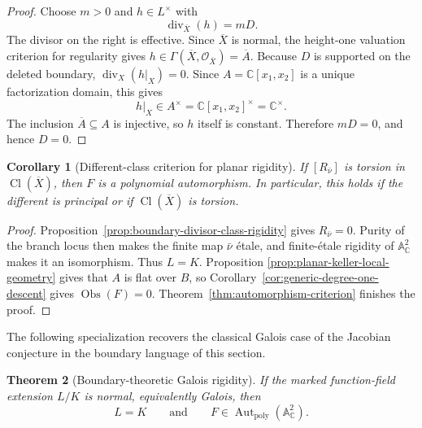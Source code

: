 \documentclass[11pt]{article}
\newtheorem{theorem}{Theorem}[section]
\newtheorem{corollary}[theorem]{Corollary}
\theoremstyle{remark}
\theoremstyle{definition}
\DeclareMathOperator{\Aut}{Aut}
\newcommand{\A}{\mathbb A}
\newcommand{\C}{\mathbb C}
\newcommand{\Obs}{\operatorname{Obs}}
\begin{document}
\begin{proof}
Choose \(m>0\) and \(h\in L^\times\) with
\[
  \operatorname{div}_{\overline X}(h)=mD.
\]
The divisor on the right is effective.  Since \(\overline X\) is normal,
the height-one valuation criterion for regularity gives
\(h\in\Gamma(\overline X,\mathcal O_{\overline X})=\overline A\).
Because \(D\) is supported on the deleted boundary,
\(\operatorname{div}_{X}(h|_X)=0\).  Since
\(A=\C[x_1,x_2]\) is a unique factorization domain, this gives
\[
  h|_X\in A^\times
  =\C[x_1,x_2]^\times
  =\C^\times.
\]
The inclusion \(\overline A\subseteq A\) is injective, so \(h\) itself is
constant.  Therefore \(mD=0\), and hence \(D=0\).
\end{proof}

\begin{corollary}[Different-class criterion for planar rigidity]
\label{cor:different-class-planar-rigidity}
If \([R_{\bar\nu}]\) is torsion in
\(\operatorname{Cl}(\overline X)\), then \(F\) is a polynomial
automorphism.  In particular, this holds if the different is principal or
if \(\operatorname{Cl}(\overline X)\) is torsion.
\end{corollary}

\begin{proof}
Proposition~\ref{prop:boundary-divisor-class-rigidity} gives
\(R_{\bar\nu}=0\).  Purity of the branch locus then makes the finite map
\(\bar\nu\) \'etale, and finite-\'etale rigidity of \(\A^2_{\C}\) makes it
an isomorphism.  Thus \(L=K\).  Proposition
\ref{prop:planar-keller-local-geometry} gives that \(A\) is flat over
\(B\), so Corollary~\ref{cor:generic-degree-one-descent} gives
\(\Obs(F)=0\).  Theorem~\ref{thm:automorphism-criterion} finishes the
proof.
\end{proof}

The following specialization recovers the classical Galois case of the
Jacobian conjecture \cite{Campbell1973,Razar1979,Wright1981} in the boundary
language of this section.

\begin{theorem}[Boundary-theoretic Galois rigidity]
\label{thm:planar-galois-rigidity}
If the marked function-field extension \(L/K\) is normal, equivalently
Galois, then
\[
  L=K
  \qquad\text{and}\qquad
  F\in\Aut_{\mathrm{poly}}(\A^2_{\C}).
\]
\end{theorem}
\end{document}
